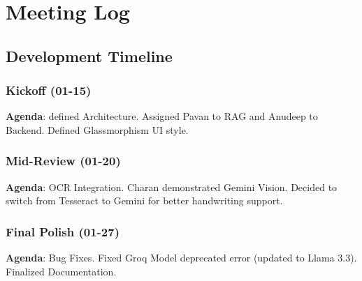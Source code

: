 \documentclass[a4paper,12pt]{report}
\begin{document}
\newpage

\part{Meeting Log}

\chapter{Development Timeline}

\section{Kickoff (01-15)}
\textbf{Agenda}: defined Architecture. Assigned Pavan to RAG and Anudeep to Backend. Defined Glassmorphism UI style.

\section{Mid-Review (01-20)}
\textbf{Agenda}: OCR Integration. Charan demonstrated Gemini Vision. Decided to switch from Tesseract to Gemini for better handwriting support.

\section{Final Polish (01-27)}
\textbf{Agenda}: Bug Fixes. Fixed Groq Model deprecated error (updated to Llama 3.3). Finalized Documentation.
\end{document}
